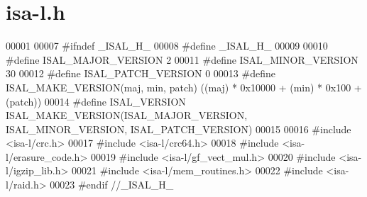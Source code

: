 \hypertarget{isa-l_8h_source}{\section{isa-\/l.h}
}

\begin{DoxyCode}
00001 
00007 \textcolor{preprocessor}{#ifndef \_ISAL\_H\_}
00008 \textcolor{preprocessor}{}\textcolor{preprocessor}{#define \_ISAL\_H\_}
00009 \textcolor{preprocessor}{}
00010 \textcolor{preprocessor}{#define ISAL\_MAJOR\_VERSION 2}
00011 \textcolor{preprocessor}{}\textcolor{preprocessor}{#define ISAL\_MINOR\_VERSION 30}
00012 \textcolor{preprocessor}{}\textcolor{preprocessor}{#define ISAL\_PATCH\_VERSION 0}
00013 \textcolor{preprocessor}{}\textcolor{preprocessor}{#define ISAL\_MAKE\_VERSION(maj, min, patch)  ((maj) * 0x10000 + (min) * 0x100 + (patch))}
00014 \textcolor{preprocessor}{}\textcolor{preprocessor}{#define ISAL\_VERSION ISAL\_MAKE\_VERSION(ISAL\_MAJOR\_VERSION, ISAL\_MINOR\_VERSION, ISAL\_PATCH\_VERSION)}
00015 \textcolor{preprocessor}{}
00016 \textcolor{preprocessor}{#include <isa-l/crc.h>}
00017 \textcolor{preprocessor}{#include <isa-l/crc64.h>}
00018 \textcolor{preprocessor}{#include <isa-l/erasure\_code.h>}
00019 \textcolor{preprocessor}{#include <isa-l/gf\_vect\_mul.h>}
00020 \textcolor{preprocessor}{#include <isa-l/igzip\_lib.h>}
00021 \textcolor{preprocessor}{#include <isa-l/mem\_routines.h>}
00022 \textcolor{preprocessor}{#include <isa-l/raid.h>}
00023 \textcolor{preprocessor}{#endif //\_ISAL\_H\_}
\end{DoxyCode}
